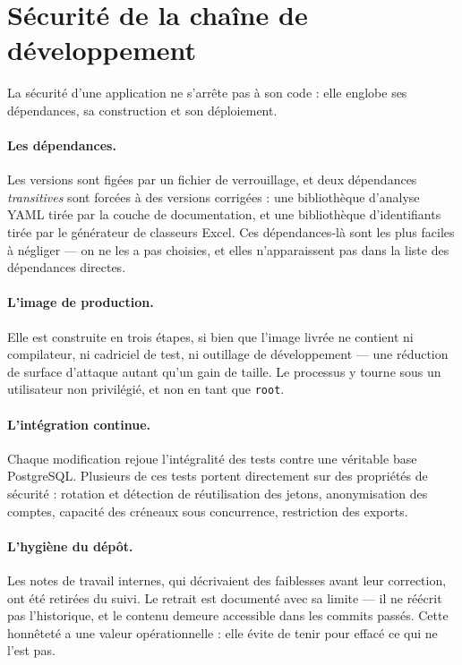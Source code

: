 \section{Sécurité de la chaîne de développement}

La sécurité d'une application ne s'arrête pas à son code : elle englobe ses
dépendances, sa construction et son déploiement.

\paragraph{Les dépendances.} Les versions sont figées par un fichier de
verrouillage, et deux dépendances \emph{transitives} sont forcées à des
versions corrigées : une bibliothèque d'analyse YAML tirée par la couche de
documentation, et une bibliothèque d'identifiants tirée par le générateur de
classeurs Excel. Ces dépendances-là sont les plus faciles à négliger --- on ne
les a pas choisies, et elles n'apparaissent pas dans la liste des dépendances
directes.

\paragraph{L'image de production.} Elle est construite en trois étapes, si bien
que l'image livrée ne contient ni compilateur, ni cadriciel de test, ni
outillage de développement --- une réduction de surface d'attaque autant qu'un
gain de taille. Le processus y tourne sous un utilisateur non privilégié, et
non en tant que \texttt{root}.

\paragraph{L'intégration continue.} Chaque modification rejoue l'intégralité des
tests contre une véritable base PostgreSQL. Plusieurs de ces tests portent
directement sur des propriétés de sécurité : rotation et détection de
réutilisation des jetons, anonymisation des comptes, capacité des créneaux sous
concurrence, restriction des exports.

\paragraph{L'hygiène du dépôt.} Les notes de travail internes, qui décrivaient
des faiblesses avant leur correction, ont été retirées du suivi. Le retrait est
documenté avec sa limite --- il ne réécrit pas l'historique, et le contenu
demeure accessible dans les commits passés. Cette honnêteté a une valeur
opérationnelle : elle évite de tenir pour effacé ce qui ne l'est pas.

